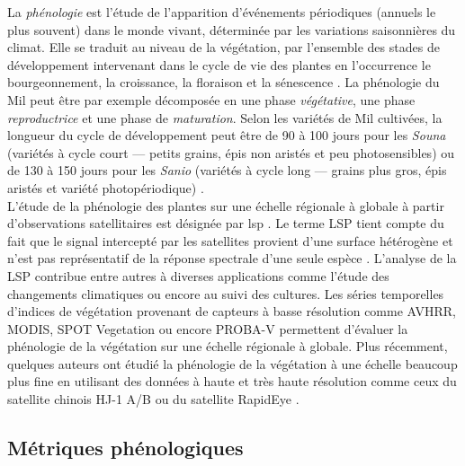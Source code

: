 La \emph{phénologie} 
est l’étude de l’apparition d’événements périodiques (annuels le plus souvent) dans le monde vivant, déterminée par les variations saisonnières du climat. Elle se traduit au niveau de 
la végétation, par l’ensemble des stades de développement intervenant dans le cycle de vie des plantes en l’occurrence le bourgeonnement, la croissance, la floraison et la 
sénescence \citep{Kimball2014}. La phénologie du Mil peut être par exemple décomposée en une phase \emph{végétative}, une phase \emph{reproductrice} et une phase de 
\emph{maturation}. Selon les variétés de Mil cultivées, la longueur du cycle de développement peut être de 90 à 100 jours pour les \emph{Souna} (variétés à cycle court --- 
petits grains, épis non aristés et peu photosensibles) ou de 130 à 150 jours pour les \emph{Sanio} (variétés à cycle long --- grains plus gros, épis aristés et variété photopériodique) \citep{Diouf2001}.
\\L'\'etude de la phénologie des plantes sur une échelle régionale à globale à partir d’observations satellitaires est désignée par \acrshort{lsp} \citep{Helman2018}. Le terme LSP 
tient compte du fait que le signal intercepté par les satellites provient d’une surface hétérogène et n’est pas représentatif de la réponse spectrale d’une seule espèce 
\citep{Kimball2014}. L'analyse de la LSP contribue entre autres à diverses applications comme l’étude des changements climatiques \citep{Begue2014} ou encore au suivi des
cultures. Les séries temporelles d’indices de végétation provenant de capteurs à basse résolution comme AVHRR, MODIS, SPOT Vegetation ou encore PROBA-V permettent d’évaluer 
la phénologie de la végétation sur une échelle régionale à globale. Plus récemment, quelques auteurs ont étudié la phénologie de la végétation à une échelle beaucoup plus fine en utilisant des données
à haute et très haute résolution comme ceux du satellite chinois HJ-1 A/B \citep{Pan2015} ou du satellite RapidEye \citep{Vrieling2017}.

  \subsection{Métriques phénologiques}

